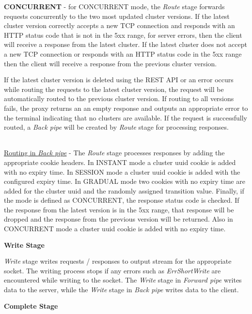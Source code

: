 \documentclass[a4paper,11pt,twoside]{article}
\begin{document}
\begin{list}{-}{}
   \item{\textbf{CONCURRENT}} - for CONCURRENT mode, the \textit{Route} stage forwards requests concurrently to the two most updated cluster versions.  If the latest cluster version correctly accepts a new TCP connection and responds with an HTTP status code that is not in the 5xx range, for server errors, then the client will receive a response from the latest cluster.  If the latest cluster does not accept a new TCP connection or responds with an HTTP status code in the 5xx range then the client will receive a response from the previous cluster version.
\end{list}

\noindent
If the latest cluster version is deleted using the REST API or an error occurs while routing the requests to the latest cluster version, the request will be automatically routed to the previous cluster version. If routing to all versions fails, the proxy returns an an empty response and outputs an appropriate error to the terminal indicating that no clusters are available. If the request is successfully routed, a \textit{Back pipe} will be created by \textit{Route} stage for processing responses.   

\noindent\\
\underline{Routing in \textit{Back pipe}} - The \textit{Route} stage processes responses by adding the appropriate cookie headers.  In INSTANT mode a cluster uuid cookie is added with no expiry time.  In SESSION mode a cluster uuid cookie is added with the configured expiry time.  In GRADUAL mode two cookies with no expiry time are added for the cluster uuid and the randomly assigned transition value.  Finally, if the mode is defined as CONCURRENT, the response status code is checked. If the response from the latest version is in the 5xx range, that response will be dropped and the response from the previous version will be returned.  Also in CONCURRENT mode a cluster uuid cookie is added with no expiry time.\bigskip

\noindent
\textbf{Write Stage} 

\noindent
\textit{Write} stage writes requests / responses to output stream for the appropriate socket. The writing process stops if any errors such as \textit{ErrShortWrite} are encountered while writing to the socket. The \textit{Write} stage in \textit{Forward pipe} writes data to the server, while the \textit{Write} stage in \textit{Back pipe} writes data to the client. \bigskip

\noindent
\textbf{Complete Stage}
\end{document}
